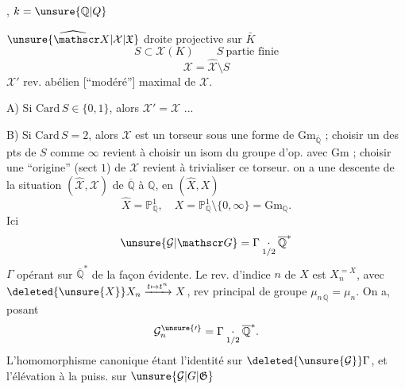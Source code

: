 
\quad{}, $k=\unsure{\mathbb Q|Q}$

$\widehat{\unsure{\mathscr X|\mathcal X|\mathfrak X}}$ droite projective sur $\bar K$
\[
S\subset\mathscr X(K)\qquad S\ \text{partie finie}
\]
\[
\mathscr X=\widehat{\mathscr X}\setminus S
\]
$\mathscr X'$ rev. abélien [``modéré''] maximal de $\mathscr X$.

A) Si $\mathrm{Card}\,S\in\{0,1\}$, alors $\mathscr X'=\mathscr X$ ...

B) Si $\mathrm{Card}\,S=2$, alors $\mathscr X$ est  un torseur sous une forme de $\mathrm{Gm}_{\overline{\mathbb Q}}$ ;  choisir un des pts de $S$ comme $\infty$  revient à choisir un isom du  groupe d’op. avec $\mathrm{Gm}$ ;  choisir une ``origine'' (sect $1$) de $\mathscr X$ revient à trivialiser ce torseur.   on a une descente de la situation $(\widehat{\mathscr X},\mathscr X)$ de $\overline{\mathbb Q}$ à $\mathbb Q$, en $(\widehat X,X)$
\[
\widehat X=\mathbb P^1_{\mathbb Q},\quad X=\mathbb P^1_{\mathbb Q}\setminus\{0,\infty\}=\mathrm{Gm}_{\mathbb Q}.
\]
Ici
\[
\unsure{\mathcal G|\mathscr G}=\Gamma\mathbin{\underset{1/2}{\cdot}}\overline{\mathbb Q}^{*}
\]
$\Gamma$ opérant sur $\overline{\mathbb Q}^{*}$ de la façon évidente. Le rev.  d’indice $n$ de $X$ est $X_n^{=X}$, avec $\deleted{\unsure{X}}X_n\xrightarrow{t\mapsto t^n}X$, rev principal de groupe $\mu_{n\,\mathbb Q}=\mu_n$. On a, posant
\[
\mathcal G_n^{\unsure{\prime}}=\Gamma\mathbin{\underset{1/2}{\cdot}}\overline{\mathbb Q}^{*}.
\]
L’homomorphisme canonique
étant l’identité sur $\deleted{\unsure{\mathcal G}}\Gamma$, et l’élévation à la puiss.  sur $\unsure{\mathcal G|G|\mathfrak G}$
